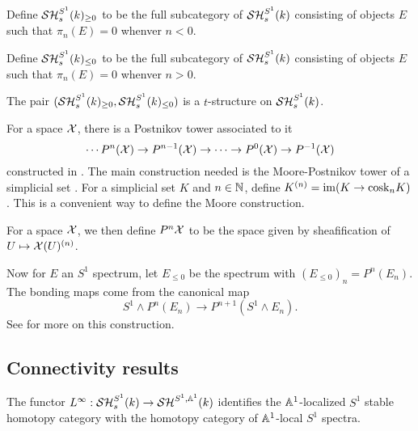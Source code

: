\documentclass{amsart}%
\newcommand{\cosk}{\mathrm{cosk}}
\begin{document}
\begin{definition}%
  Define $\mathcal{SH}_s^{S^1}(k)_{\geq 0}$ to be the full subcategory of
  $\mathcal{SH}_s^{S^1}(k)$ consisting of objects $E$ such that $\pi_n(E)=0$
  whenver $n<0$.
  
  Define $\mathcal{SH}_s^{S^1}(k)_{\leq 0}$ to be the full subcategory of
  $\mathcal{SH}_s^{S^1}(k)$ consisting of objects $E$ such that $\pi_n(E)=0$
  whenver $n>0$.
\end{definition}

\begin{theorem}
  The pair $(\mathcal{SH}_s^{S^1}(k)_{\geq 0}, \mathcal{SH}_s^{S^1}(k)_{\leq 0})$ is a
  $t$-structure on $\mathcal{SH}_s^{S^1}(k)$.
\end{theorem}


\begin{remark}
  For a space $\mathcal{X}$, there is a Postnikov tower associated to it
  \begin{equation*}
    \cdots P^n(\mathcal{X})\to P^{n-1}(\mathcal{X}) \to \cdots \to P^{0}(\mathcal{X}) \to P^{-1}(\mathcal{X})
  \end{equation*}
  constructed in \cite[p. 57]{MV99}. The main construction needed is the
  Moore-Postnikov tower of a simplicial set \cite[VI.3.4]{GJ91}. For a
  simplicial set $K$ and $n\in\mathbb{N}$, define
  $K^{(n)} = \im ( K \to \cosk_nK)$. This is a convenient way to
  define the Moore construction. 

  For a space $\mathcal{X}$, we then define $P^{n}\mathcal{X}$ to be the space
  given by sheafification of $U \mapsto \mathcal{X}(U)^{(n)}$.

  Now for $E$ an $S^1$ spectrum, let $E_{\leq 0}$ be the spectrum with
  $(E_{\leq 0})_n = P^n(E_n)$. The bonding maps come from the
  canonical map
  \begin{equation*}
    S^1 \wedge P^n(E_n) \to P^{n+1}(S^1 \wedge E_n).
  \end{equation*}
  See \cite[Lemma 3.2.1]{Mor05} for more on this construction.
\end{remark}

\subsection{Connectivity results}

\begin{proposition}\cite[Lemma4.2.4]{Mor03}
  The functor $L^{\infty} : \mathcal{SH}_s^{S^1}(k) \to \mathcal{SH}^{S^1,\mathbb{A}^1}(k)$
  identifies the $\mathbb{A}^1$-localized $S^1$ stable homotopy category
  with the homotopy category of $\mathbb{A}^1$-local $S^1$ spectra.
\end{proposition}
\end{document}
